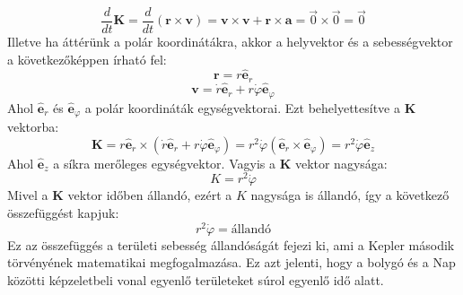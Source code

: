 \documentclass[../main.tex]{subfiles}
\begin{document}
\begin{equation}
    \frac{d}{dt} \mathbf{K} = \frac{d}{dt} (\mathbf{r} \times \mathbf{v}) = \mathbf{v} \times \mathbf{v} + \mathbf{r} \times \mathbf{a} = \vec{0} \times \vec{0} = \vec{0}
\end{equation}
Illetve ha áttérünk a polár koordinátákra, akkor a helyvektor és a sebességvektor a következőképpen írható fel:
\begin{equation}
    \mathbf{r} = r \hat{\mathbf{e}}_r
\end{equation}
\begin{equation}
    \mathbf{v} = \dot{r} \hat{\mathbf{e}}_r + r \dot{\varphi} \hat{\mathbf{e}}_{\varphi}
\end{equation}
Ahol $\hat{\mathbf{e}}_r$ és $\hat{\mathbf{e}}_{\varphi}$ a polár koordináták egységvektorai. Ezt behelyettesítve a $\mathbf{K}$ vektorba:
\begin{equation}
    \mathbf{K} = r \hat{\mathbf{e}}_r \times (\dot{r} \hat{\mathbf{e}}_r + r \dot{\varphi} \hat{\mathbf{e}}_{\varphi}) = r^2 \dot{\varphi} (\hat{\mathbf{e}}_r \times \hat{\mathbf{e}}_{\varphi}) = r^2 \dot{\varphi} \hat{\mathbf{e}}_z
\end{equation}
Ahol $\hat{\mathbf{e}}_z$ a síkra merőleges egységvektor. Vagyis a $\mathbf{K}$ vektor nagysága:
\begin{equation}
    K = r^2 \dot{\varphi}
\end{equation}
Mivel a $\mathbf{K}$ vektor időben állandó, ezért a $K$ nagysága is állandó, így a következő összefüggést kapjuk:
\begin{equation}
    r^2 \dot{\varphi} = \text{állandó}
\end{equation}
Ez az összefüggés a területi sebesség állandóságát fejezi ki, ami a Kepler második törvényének matematikai megfogalmazása. Ez azt jelenti, hogy a bolygó és a Nap közötti képzeletbeli vonal egyenlő területeket súrol egyenlő idő alatt.
\end{document}
